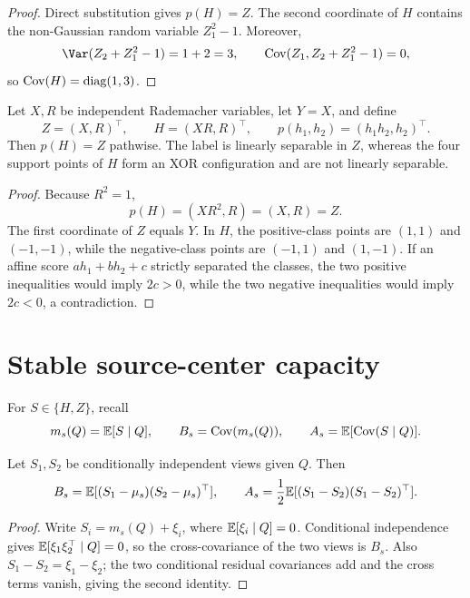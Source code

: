 \begin{proof}
Direct substitution gives $p(H)=Z$. The second coordinate of $H$ contains the
non-Gaussian random variable $Z_1^2-1$. Moreover,
\[
\Var(Z_2+Z_1^2-1)=1+2=3,
\qquad
\Cov(Z_1,Z_2+Z_1^2-1)=0,
\]
so $\operatorname{Cov}(H)=\operatorname{diag}(1,3)$.
\end{proof}

\begin{corollary}
\label{cor:separability}
Let $X,R$ be independent Rademacher variables, let $Y=X$, and define
\[
Z=(X,R)^\top,
\qquad
H=(XR,R)^\top,
\qquad
p(h_1,h_2)=(h_1h_2,h_2)^\top.
\]
Then $p(H)=Z$ pathwise. The label is linearly separable in $Z$, whereas the four
support points of $H$ form an XOR configuration and are not linearly separable.
\end{corollary}

\begin{proof}
Because $R^2=1$,
\[
p(H)=(XR^2,R)=(X,R)=Z.
\]
The first coordinate of $Z$ equals $Y$. In $H$, the positive-class points are
$(1,1)$ and $(-1,-1)$, while the negative-class points are $(-1,1)$ and
$(1,-1)$. If an affine score $ah_1+bh_2+c$ strictly separated the classes, the
two positive inequalities would imply $2c>0$, while the two negative
inequalities would imply $2c<0$, a contradiction.
\end{proof}


\section{Stable source-center capacity}\label{app:capacity}

For $S\in\{H,Z\}$, recall
\[
m_s(Q)=\mathbb{E}[S\mid Q],
\qquad
B_s=\operatorname{Cov}(m_s(Q)),
\qquad
A_s=\mathbb{E}[\operatorname{Cov}(S\mid Q)].
\]

\begin{proposition}
\label{prop:paired}
Let $S_1,S_2$ be conditionally independent views given $Q$. Then
\[
B_s=\mathbb{E}[(S_1-\mu_s)(S_2-\mu_s)^\top],
\qquad
A_s=\frac12\mathbb{E}[(S_1-S_2)(S_1-S_2)^\top].
\]
\end{proposition}

\begin{proof}
Write $S_i=m_s(Q)+\xi_i$, where $\mathbb{E}[\xi_i\mid Q]=0$. Conditional independence
gives $\mathbb{E}[\xi_1\xi_2^\top\mid Q]=0$, so the cross-covariance of the two views is
$B_s$. Also $S_1-S_2=\xi_1-\xi_2$; the two conditional residual covariances add
and the cross terms vanish, giving the second identity.
\end{proof}

